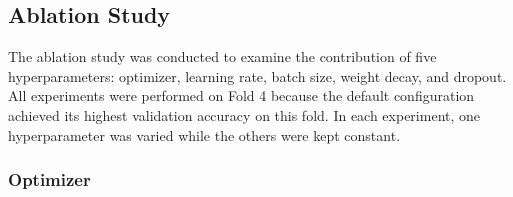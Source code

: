 \documentclass[10pt,TimesNewRoman,a4paper]{matrikenglish}
\begin{document}

\subsection{Ablation Study}
\label{IV.evaluasi-ablasi}

The ablation study was conducted to examine the contribution of five hyperparameters: optimizer, learning rate, batch size, weight decay, and dropout. All experiments were performed on Fold 4 because the default configuration achieved its highest validation accuracy on this fold. In each experiment, one hyperparameter was varied while the others were kept constant.

\subsubsection{Optimizer}
\label{IV.optimizer}
\end{document}
